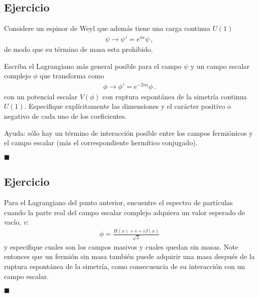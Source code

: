 \subsection*{Ejercicio}

Considere un espinor de Weyl que además tiene una carga continua $U(1)$
  \begin{align}
    \psi\to \psi'=e^{i\alpha}\psi\,,
  \end{align}
de modo que su término de masa esta prohibido.

Escriba el Lagrangiano más general posible para el campo $\psi$ y un campo escalar complejo $\phi$ que transforma como
\begin{align}
  \phi\to \phi'=e^{-2i\alpha}\phi\,.
\end{align}
con un potencial escalar $V(\phi)$ con ruptura espontánea de la simetría continua $U(1)$. Especifique explícitamente las dimensiones y el carácter positivo o negativo de cada uno de los coeficientes. 

Ayuda: sólo hay un término de interacción posible entre los campos fermiónicos y el campo escalar (más el correspondiente hermítico conjugado).

\hrulefill{}$\blacksquare$


\subsection{Ejercicio}

Para el Lagrangiano del punto anterior, encuentre el espectro de partículas cuando la parte real del campo escalar complejo adquiera un valor esperado de vacío, $v$:
  \begin{align*}
    \phi=\frac{H(x)+v+i J(x)}{\sqrt{2}}
  \end{align*}
y especifique cuales son los campos masivos y cuales quedan sin masas. Note entonces que un fermión sin masa también puede adquirir una masa después de la ruptura espontánea de la simetría, como consecuencia de su interacción con un campo escalar.
\label{item:ssb}

\hrulefill{}$\blacksquare$






